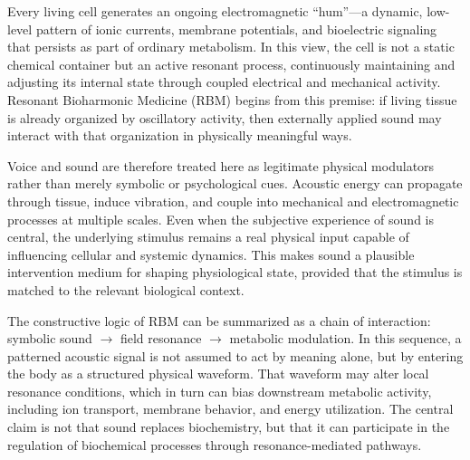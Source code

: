 Every living cell generates an ongoing electromagnetic ``hum''---a dynamic, low-level pattern of ionic currents, membrane potentials, and bioelectric signaling that persists as part of ordinary metabolism. In this view, the cell is not a static chemical container but an active resonant process, continuously maintaining and adjusting its internal state through coupled electrical and mechanical activity. Resonant Bioharmonic Medicine (RBM) begins from this premise: if living tissue is already organized by oscillatory activity, then externally applied sound may interact with that organization in physically meaningful ways.

Voice and sound are therefore treated here as legitimate physical modulators rather than merely symbolic or psychological cues. Acoustic energy can propagate through tissue, induce vibration, and couple into mechanical and electromagnetic processes at multiple scales. Even when the subjective experience of sound is central, the underlying stimulus remains a real physical input capable of influencing cellular and systemic dynamics. This makes sound a plausible intervention medium for shaping physiological state, provided that the stimulus is matched to the relevant biological context.

The constructive logic of RBM can be summarized as a chain of interaction: symbolic sound $\rightarrow$ field resonance $\rightarrow$ metabolic modulation. In this sequence, a patterned acoustic signal is not assumed to act by meaning alone, but by entering the body as a structured physical waveform. That waveform may alter local resonance conditions, which in turn can bias downstream metabolic activity, including ion transport, membrane behavior, and energy utilization. The central claim is not that sound replaces biochemistry, but that it can participate in the regulation of biochemical processes through resonance-mediated pathways.

